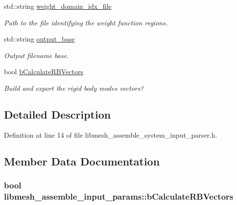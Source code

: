 \begin{DoxyCompactItemize}
std\+::string \hyperlink{structlibmesh__assemble__input__params_a9b91599c97b26e5446f26440f74b896f}{weight\+\_\+domain\+\_\+idx\+\_\+file}
\begin{DoxyCompactList}\small\item\em Path to the file identifying the weight function regions. \end{DoxyCompactList}\item 
std\+::string \hyperlink{structlibmesh__assemble__input__params_af6d7a41287b40d913e5110b115b0b692}{output\+\_\+base}
\begin{DoxyCompactList}\small\item\em Output filename base. \end{DoxyCompactList}\item 
bool \hyperlink{structlibmesh__assemble__input__params_ae23881f91f012a17aca3f6d296f97ae9}{b\+Calculate\+R\+B\+Vectors}
\begin{DoxyCompactList}\small\item\em Build and export the rigid body modes vectors? \end{DoxyCompactList}\end{DoxyCompactItemize}


\subsection{Detailed Description}


Definition at line 14 of file libmesh\+\_\+assemble\+\_\+system\+\_\+input\+\_\+parser.\+h.



\subsection{Member Data Documentation}
\hypertarget{structlibmesh__assemble__input__params_ae23881f91f012a17aca3f6d296f97ae9}{}
\subsubsection[{b\+Calculate\+R\+B\+Vectors}]{\setlength{\rightskip}{0pt plus 5cm}bool libmesh\+\_\+assemble\+\_\+input\+\_\+params\+::b\+Calculate\+R\+B\+Vectors}\label{structlibmesh__assemble__input__params_ae23881f91f012a17aca3f6d296f97ae9}


